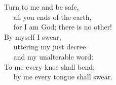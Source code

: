 
\lettrine{T}{}urn to me and be safe,\\
   all you ends of the earth,\\
   for I am God; there is no other!\\
By myself I swear,\\
   uttering my just decree\\
   and my unalterable word:\\
To me every knee shall bend;\\
   by me every tongue shall swear.
